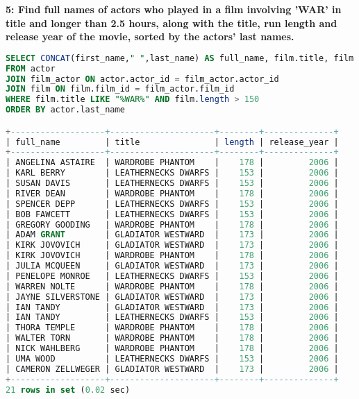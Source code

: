 \documentclass[12pt]{article}
\begin{document}
\textbf{5: Find full names of actors who played in a film involving ’WAR’ in title and longer than 2.5 hours, along with the title, run length and release year of the movie, sorted by the actors’ last names.}
\begin{lstlisting}[language=SQL]
SELECT CONCAT(first_name," ",last_name) AS full_name, film.title, film.length,  film.release_year 
FROM actor 
JOIN film_actor ON actor.actor_id = film_actor.actor_id
JOIN film ON film.film_id = film_actor.film_id
WHERE film.title LIKE "%WAR%" AND film.length > 150
ORDER BY actor.last_name

+-------------------+---------------------+--------+--------------+
| full_name         | title               | length | release_year |
+-------------------+---------------------+--------+--------------+
| ANGELINA ASTAIRE  | WARDROBE PHANTOM    |    178 |         2006 |
| KARL BERRY        | LEATHERNECKS DWARFS |    153 |         2006 |
| SUSAN DAVIS       | LEATHERNECKS DWARFS |    153 |         2006 |
| RIVER DEAN        | WARDROBE PHANTOM    |    178 |         2006 |
| SPENCER DEPP      | LEATHERNECKS DWARFS |    153 |         2006 |
| BOB FAWCETT       | LEATHERNECKS DWARFS |    153 |         2006 |
| GREGORY GOODING   | WARDROBE PHANTOM    |    178 |         2006 |
| ADAM GRANT        | GLADIATOR WESTWARD  |    173 |         2006 |
| KIRK JOVOVICH     | GLADIATOR WESTWARD  |    173 |         2006 |
| KIRK JOVOVICH     | WARDROBE PHANTOM    |    178 |         2006 |
| JULIA MCQUEEN     | GLADIATOR WESTWARD  |    173 |         2006 |
| PENELOPE MONROE   | LEATHERNECKS DWARFS |    153 |         2006 |
| WARREN NOLTE      | WARDROBE PHANTOM    |    178 |         2006 |
| JAYNE SILVERSTONE | GLADIATOR WESTWARD  |    173 |         2006 |
| IAN TANDY         | GLADIATOR WESTWARD  |    173 |         2006 |
| IAN TANDY         | LEATHERNECKS DWARFS |    153 |         2006 |
| THORA TEMPLE      | WARDROBE PHANTOM    |    178 |         2006 |
| WALTER TORN       | WARDROBE PHANTOM    |    178 |         2006 |
| NICK WAHLBERG     | WARDROBE PHANTOM    |    178 |         2006 |
| UMA WOOD          | LEATHERNECKS DWARFS |    153 |         2006 |
| CAMERON ZELLWEGER | GLADIATOR WESTWARD  |    173 |         2006 |
+-------------------+---------------------+--------+--------------+
21 rows in set (0.02 sec)
\end{lstlisting}
\end{document}
